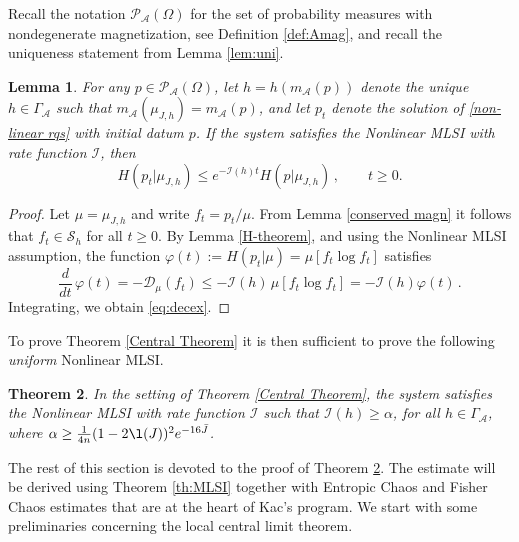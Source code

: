 \documentclass[11pt,reqno]{amsart}
\numberwithin{equation}{section}
\numberwithin{figure}{section}
\newtheorem{theorem}{Theorem}[section]
\newtheorem{lemma}[theorem]{Lemma}
\renewcommand{\leq}{\le}%
\newcommand{\1}{\mathds{1}}
\let\a=\alpha \let\b=\beta \let\g=\gamma \let\d=\delta
\let\O=\Omega
\let\G=\Gamma
\newcommand{\cA}{\ensuremath{\mathcal A}}
\newcommand{\cD}{\ensuremath{\mathcal D}}
\newcommand{\cI}{\ensuremath{\mathcal I}}
\newcommand{\cP}{\ensuremath{\mathcal P}}
\newcommand{\cS}{\ensuremath{\mathcal S}}
\begin{document}
Recall the notation $\cP_\cA(\O)$ for the set of probability measures with nondegenerate magnetization, see Definition \ref{def:Amag}, and recall the uniqueness statement from Lemma \ref{lem:uni}.
\begin{lemma}\label{lem:nmlsi}
For any $p\in\cP_\cA(\O)$, let $h=h(m_\cA(p))$ denote the unique $h\in\G_\cA$ such that $m_\cA(\mu_{J,h})=m_\cA(p)$, and let \(p_t\) denote the solution of \eqref{non-linear rqs} with initial datum $p$. If the system satisfies the Nonlinear MLSI with rate function $\cI$, then 
\begin{equation}\label{eq:decex}
    H(p_t|\mu_{J,h}) \leq e^{-\cI(h) t} H(p|\mu_{J,h})\,,\qquad t\ge 0.
\end{equation}
\end{lemma}
\begin{proof}
Let $\mu=\mu_{J,h}$ and write $f_t=p_t/\mu$.  From Lemma \ref{conserved magn} it follows that $f_t\in\cS_h$ for all $t\ge 0$. 
By Lemma \ref{H-theorem}, and using the Nonlinear MLSI assumption, 
the function $\varphi(t):=H(p_t|\mu)=\mu[f_t\log f_t]$ satisfies 
\[
\frac{d}{dt}\,\varphi(t)  = - \cD_\mu(f_t)\le - \cI(h) \,\mu\left[f_t\log f_t\right]
=- \cI(h) \varphi(t)\,.
\] 
Integrating, we obtain \eqref{eq:decex}.
\end{proof}
To prove Theorem \ref{Central Theorem} it is then sufficient to prove the following {\em uniform} Nonlinear MLSI. 
\begin{theorem}\label{th:unmlsi}
In the setting of Theorem \ref{Central Theorem}, the system satisfies the Nonlinear MLSI with rate function $\cI$ such that
$\cI(h)\ge \a$, for all $h\in\G_\cA$, where $\a\ge \frac1{4n}(1-2\l(J))^2e^{-16\bar J}$.
\end{theorem}
The rest of this section is devoted to the proof of Theorem \ref{th:unmlsi}. The estimate will be derived using Theorem \ref{th:MLSI} together with Entropic Chaos and Fisher Chaos estimates that are at the heart of Kac's program.  We start with some preliminaries concerning the local central limit theorem.
\end{document}
